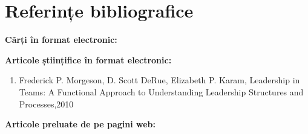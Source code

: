 \documentclass[a4paper, 12pt]{article}
\begin{document}
	
	







\newpage

	\section*{Referințe bibliografice}
	\space
	\bigskip
	\bigskip

	\textbf{Cărți în format electronic:}
	

	\textbf{Articole științifice în format electronic:}
	\begin{enumerate}[1.]
		\item Frederick P. Morgeson, D. Scott DeRue, Elizabeth P. Karam, Leadership in Teams: A Functional Approach to Understanding Leadership Structures and Processes,2010
	\end{enumerate}

	\textbf{Articole preluate de pe pagini web:}
\end{document}
